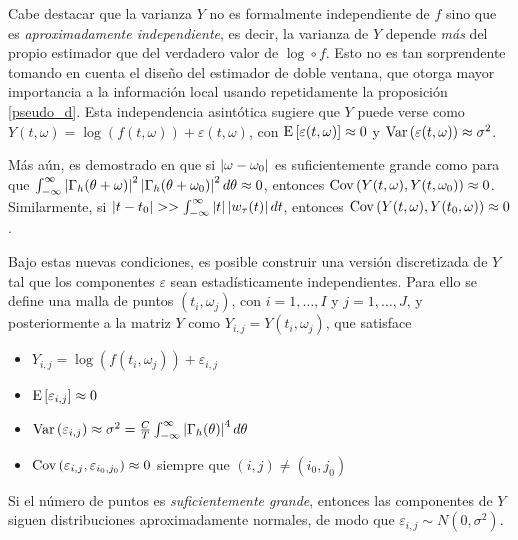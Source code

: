 Cabe destacar que la varianza $Y$ no es formalmente independiente de $f$ sino que es 
\textit{aproximadamente independiente}, es decir, la varianza de $Y$ depende \textit{más} 
del propio estimador que del verdadero valor de $\log\circ f$.
Esto no es tan sorprendente tomando en cuenta el diseño del estimador de doble ventana, que otorga 
mayor importancia a la información local usando repetidamente la proposición \ref{pseudo_d}. Esta 
independencia asintótica sugiere que $Y$ puede verse como
%
$Y(t,\omega) = \log\left(f(t,\omega) \right) + \varepsilon(t,\omega)$,
%
con $\mathrm{E}\left[ \varepsilon(t,\omega) \right] \approx 0$ y $\mathrm{Var}\left( \varepsilon(t,\omega) \right) \approx \sigma^{2}$.

Más aún, es demostrado en \cite{Priestley66} que si $\left| \omega-\omega_0 \right|$ es suficientemente 
grande como para que 
$\int_{-\infty}^{\infty} \left| \Gamma_h(\theta+\omega) \right|^{2}\left| \Gamma_h(\theta+\omega_0) \right|^{2} d\theta \approx 0$,
entonces 
%
$\mathrm{Cov}\left( Y(t,\omega),Y(t,\omega_0) \right) \approx 0$.
%
Similarmente, si $\left| t-t_0 \right| >> \int_{-\infty}^{\infty} \left| t \right| \left| w_\tau (t) \right| dt $, entonces
%
$\mathrm{Cov}\left( Y(t,\omega),Y(t_0,\omega) \right) \approx 0$.

Bajo estas nuevas condiciones, es posible construir una versión discretizada de $Y$ tal que los 
componentes $\varepsilon$ sean estadísticamente independientes. Para ello se define una malla de 
puntos $(t_i,\omega_j)$, con $i = 1,\dots,I$ y  $j=1,\dots,J$, y posteriormente a la matriz $Y$ 
como $Y_{i,j} = Y(t_i,\omega_j)$, que satisface
%
\begin{itemize}
\item $Y_{i,j} = \log\left(f(t_i,\omega_j)\right) + \varepsilon_{i,j}$
\item $\mathrm{E}\left[ \varepsilon_{i,j} \right] \approx 0$
\item $\mathrm{Var}\left( \varepsilon_{i,j} \right) \approx \sigma^{2} = 
\frac{C}{T} \int_{-\infty}^{\infty} \left| \Gamma_h(\theta) \right|^{4} d\theta$
\item $\mathrm{Cov}\left( \varepsilon_{i,j},\varepsilon_{i_0,j_0} \right) \approx 0$ siempre que $(i,j)\neq (i_0,j_0)$
\end{itemize}

Si el número de puntos es \textit{suficientemente grande}, entonces
las componentes de $Y$ siguen distribuciones aproximadamente normales, de modo que
$\varepsilon_{i,j} \sim N(0,\sigma^{2})$.

